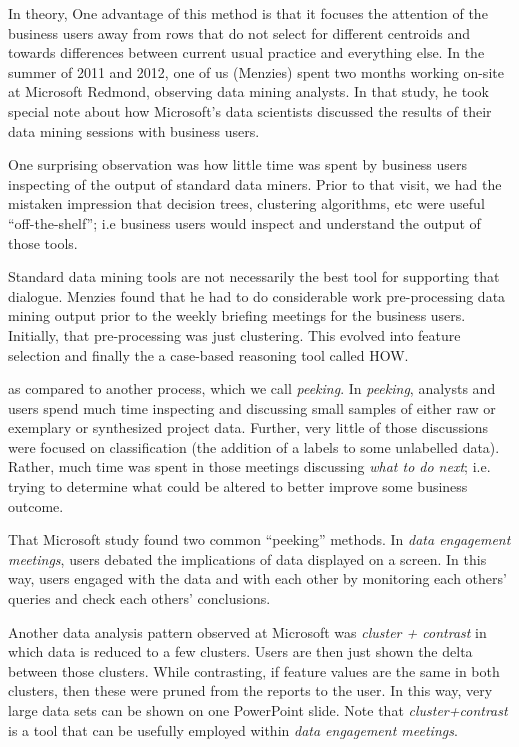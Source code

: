 \documentclass{sig-alternate}
\begin{document}
		
	
		

In theory, One  advantage of this method is that it focuses the attention of the business users
away from rows that do not select for different centroids and towards differences between
current usual practice and everything else.  
In the summer of 2011 and 2012, one of us (Menzies) spent two months
	working on-site at Microsoft Redmond,
	observing data mining analysts.  In that study, he took special
	note about how Microsoft's data scientists
	discussed the results of their data mining sessions with  business users. 
	
	One surprising observation was how  
	little time was spent by business users 
	inspecting  of the output of standard data miners. Prior to that visit,
	we had the mistaken impression that   decision trees,
	clustering algorithms, etc were useful ``off-the-shelf''; i.e    business
	users would inspect and understand the output of those tools.
	
Standard data mining tools are not necessarily the best tool for supporting that dialogue.
Menzies found that he had to do considerable work pre-processing data mining output
prior to the weekly briefing meetings for the business users. Initially,
that pre-processing was just clustering. This evolved into feature selection and finally
the a case-based reasoning tool called HOW.  


	
	as compared to another process, which we call {\em peeking}.
	In {\em peeking}, analysts and users spend much time
	inspecting and discussing small samples of either raw or exemplary or synthesized project data.  Further, very little of those discussions were  focused on classification
	(the addition of a labels to some unlabelled data). Rather, much time
	was spent in those meetings discussing {\em what to do next}; i.e. trying
	to determine what could be altered to better improve some business outcome.
	
	That   Microsoft  study found two common ``peeking'' methods.
	In {\em data engagement meetings},
	users debated the implications of data
	displayed on a screen. In this way, users
	engaged with the data and with each other by
	monitoring each others' queries and check each others'
	conclusions.
	
	Another data analysis pattern observed
	at Microsoft was  {\em cluster + contrast} in which
	data is  reduced to a few
	clusters. Users are then just shown the delta between those
	clusters. While contrasting, if feature values are
	the same in both clusters, then these were pruned from
	the reports to the user. In this way, very large
	data sets can be shown on one PowerPoint
	slide. Note that {\em cluster+contrast} is a tool that can be usefully employed within
	{\em data engagement meetings}.
	
\end{document}
